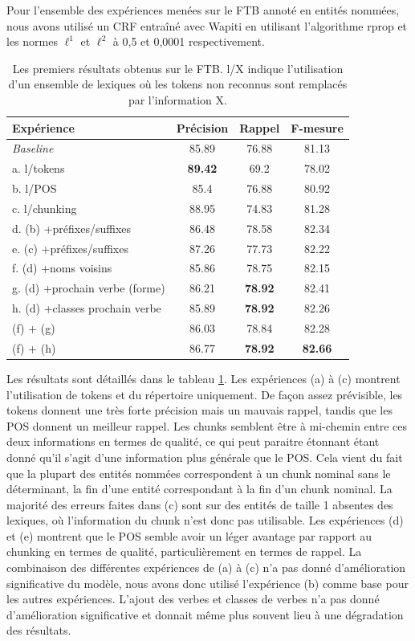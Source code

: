 \documentclass[12pt,a4paper,times,twoside,openright]{report}
\begin{document}
Pour l'ensemble des expériences menées sur le FTB annoté en entités nommées, nous avons utilisé un CRF entraîné avec Wapiti en utilisant l'algorithme rprop et les normes $\ell^{1}$ et $\ell^{2}$ à 0,5 et 0,0001 respectivement.

\begin{table}[ht!]
\centering
\begin{tabular}{|l|c|c|c|}
\hline
Expérience                & Précision & Rappel & F-mesure \\
\hline
\emph{Baseline}           & 85.89     & 76.88  & 81.13 \\
a. l/tokens                 & \textbf{89.42}     & 69.2   & 78.02 \\
b. l/POS                  & 85.4      & 76.88  & 80.92 \\
c. l/chunking             & 88.95     & 74.83  & 81.28 \\
d. (b) +préfixes/suffixes & 86.48     & 78.58  & 82.34 \\
e. (c) +préfixes/suffixes & 87.26     & 77.73  & 82.22 \\
\hline
f. (d) +noms voisins           & 85.86 & 78.75 & 82.15 \\
g. (d) +prochain verbe (forme) & 86.21 & \textbf{78.92} & 82.41 \\
h. (d) +classes prochain verbe & 85.89 & \textbf{78.92} & 82.26 \\
\hline
(f) + (g) & 86.03 & 78.84 & 82.28 \\
(f) + (h) & 86.77 & \textbf{78.92} & \textbf{82.66} \\
\hline
\end{tabular}
\caption{Les premiers résultats obtenus sur le FTB. l/X indique l'utilisation d'un ensemble de lexiques où les tokens non reconnus sont remplacés par l'information X.}
\label{tab:ftb-first-results}
\end{table}

Les résultats sont détaillés dans le tableau \ref{tab:ftb-first-results}. Les expériences (a) à (c) montrent l'utilisation de tokens et du répertoire uniquement. De façon assez prévisible, les tokens donnent une très forte précision mais un mauvais rappel, tandis que les POS donnent un meilleur rappel. Les chunks semblent être à mi-chemin entre ces deux informations en termes de qualité, ce qui peut paraitre étonnant étant donné qu'il s'agit d'une information plus générale que le POS. Cela vient du fait que la plupart des entités nommées correspondent à un chunk nominal sans le déterminant, la fin d'une entité correspondant à la fin d'un chunk nominal. La majorité des erreurs faites dans (c) sont sur des entités de taille 1 absentes des lexiques, où l'information du chunk n'est donc pas utilisable. Les expériences (d) et (e) montrent que le POS semble avoir un léger avantage par rapport au chunking en termes de qualité, particulièrement en termes de rappel. La combinaison des différentes expériences de (a) à (c) n'a pas donné d'amélioration significative du modèle, nous avons donc utilisé l'expérience (b) comme base pour les autres expériences. L'ajout des verbes et classes de verbes n'a pas donné d'amélioration significative et donnait même plus souvent lieu à une dégradation des résultats.
\end{document}
